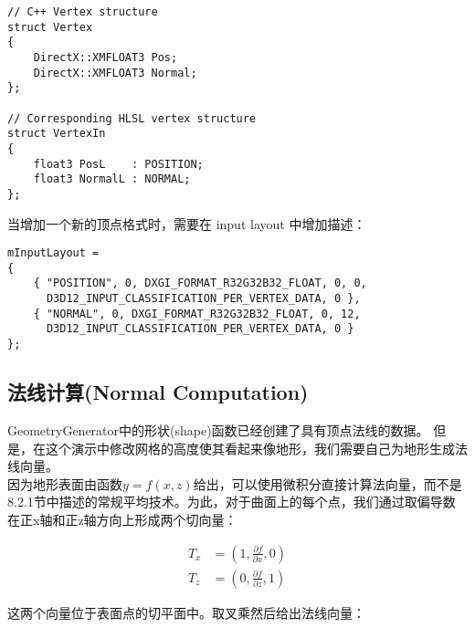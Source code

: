 \begin{lstlisting}
// C++ Vertex structure
struct Vertex
{
    DirectX::XMFLOAT3 Pos;
    DirectX::XMFLOAT3 Normal;
};

// Corresponding HLSL vertex structure
struct VertexIn
{
    float3 PosL    : POSITION;
    float3 NormalL : NORMAL;
};
\end{lstlisting}

\begin{flushleft}
当增加一个新的顶点格式时，需要在 input layout 中增加描述：\\
\end{flushleft}

\begin{lstlisting}
mInputLayout =
{
    { "POSITION", 0, DXGI_FORMAT_R32G32B32_FLOAT, 0, 0,
      D3D12_INPUT_CLASSIFICATION_PER_VERTEX_DATA, 0 },
    { "NORMAL", 0, DXGI_FORMAT_R32G32B32_FLOAT, 0, 12,
      D3D12_INPUT_CLASSIFICATION_PER_VERTEX_DATA, 0 }
};
\end{lstlisting}

\subsection{法线计算(Normal Computation)}
\begin{flushleft}
GeometryGenerator中的形状(shape)函数已经创建了具有顶点法线的数据。 但是，在这个演示中修改网格的高度使其看起来像地形，我们需要自己为地形生成法线向量。\\
因为地形表面由函数$y=f(x,z)$给出，可以使用微积分直接计算法向量，而不是8.2.1节中描述的常规平均技术。为此，对于曲面上的每个点，我们通过取偏导数在正x轴和正z轴方向上形成两个切向量：\\
\end{flushleft}

\begin{align*}
T_{x}&=(1, \frac{\partial f}{\partial x},0)\\
T_{z}&=(0,\frac{\partial f}{\partial z},1)
\end{align*}

\begin{flushleft}
这两个向量位于表面点的切平面中。取叉乘然后给出法线向量：\\
\end{flushleft}

